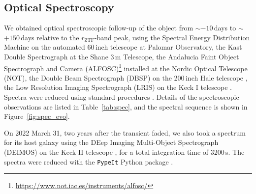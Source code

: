 \documentclass[twocolumn]{aastex631}
\begin{document}
\subsection{Optical Spectroscopy}\label{sec:optical_spec}
We obtained optical spectroscopic follow-up of the object from $\sim$$-10$\,days to $\sim$$+150$\,days relative to the $r_\mathrm{ZTF}$-band peak, using the Spectral Energy Distribution Machine \citep[SEDM;][]{SEDM_2018} on the automated 60\,inch telescope \citep[P60;][]{P60_2006} at Palomar Observatory, the Kast Double Spectrograph \citep{miller1994kast} at the Shane 3\,m Telescope, the Andalucia Faint Object Spectrograph and Camera (ALFOSC)\footnote{\url{https://www.not.iac.es/instruments/alfosc/}} installed at the Nordic Optical Telescope (NOT), the Double Beam Spectrograph (DBSP) on the 200\,inch Hale telescope \citep[P200;][]{P200_1982}, the Low Resolution Imaging Spectrograph (LRIS) on the Keck I telescope \citep{Keck_1995}. Spectra were reduced using standard procedures \citep[e.g.,][]{Matheson_2000}. Details of the spectroscopic observations are listed in Table~\ref{tab:spec}, and the spectral sequence is shown in Figure~\ref{fig:spec_evo}.

On 2022 March 31, two years after the transient faded, we also took a spectrum for its host galaxy using the DEep Imaging Multi-Object Spectrograph (DEIMOS) on the Keck II telescope \citep{DEIMOS_2003}, for a total integration time of 3200\,s. The spectra were reduced with the \texttt{PypeIt} Python package \citep{pypeit:joss_pub}.
\end{document}
